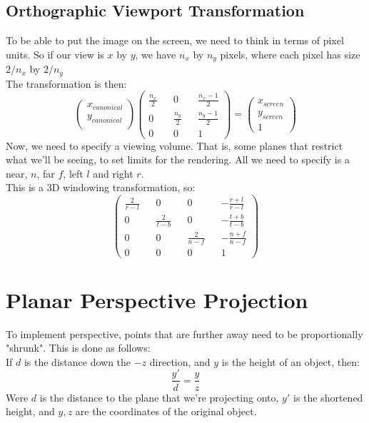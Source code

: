 \documentclass[12pt]{article}
\theoremstyle{definition}
\begin{document}
\subsection{Orthographic Viewport Transformation}
To be able to put the image on the screen, we need to think in terms of pixel units. So if our view is $x$ by $y$, we have $n_x$ by $n_y$ pixels, where each pixel has size $2/n_x$ by $2/n_y$
\\ \linebreak
The transformation is then:
$$\begin{pmatrix}
x_{canonical} \\
y_{canonical} \\
\end{pmatrix}
\begin{pmatrix}
\frac{n_x}{2} && 0 &&\frac{n_x-1}{2} \\
0             && \frac{n_y}{2} && \frac{n_y-1}{2} \\
0 && 0 && 1
\end{pmatrix}
=
\begin{pmatrix}
x_{screen} \\ y_{screen} \\ 1
\end{pmatrix}
$$
Now, we need to specify a viewing volume. That is, some planes that restrict what we'll be seeing, to set limits for the rendering. All we need to specify is a near, $n$, far $f$, left $l$ and right $r$.
\\ \linebreak
This is a 3D windowing transformation, so:
$$\begin{pmatrix}
\frac{2}{r-l} && 0 && 0 && -\frac{r+l}{r-l} \\
0 && \frac{2}{t-b} && 0 && -\frac{t+b}{t-b} \\
0 && 0 && \frac{2}{n-f} && -\frac{n+f}{n-f} \\
0 && 0 && 0 && 1
\end{pmatrix}$$

\section{Planar Perspective Projection}
To implement perspective, points that are further away need to be proportionally "shrunk". This is done as follows:
\\ \linebreak
If $d$ is the distance down the $-z$ direction, and $y$ is the height of an object, then:
$$\frac{y'}{d} = \frac{y}{z}$$
Were $d$ is the distance to the plane that we're projecting onto, $y'$ is the shortened height, and $y,z$ are the coordinates of the original object.
\\ \linebreak
\end{document}
